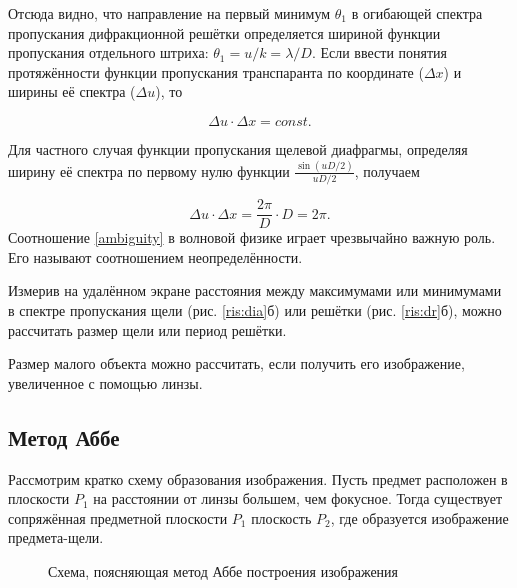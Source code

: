 \documentclass[a5paper,10pt, twoside]{article} %
\begin{document}
		Отсюда видно, что направление на первый минимум $\theta_1$ в огибающей спектра пропускания дифракционной решётки определяется шириной функции пропускания отдельного штриха: $\theta_1 = u / k = \lambda / D$. Если ввести понятия протяжённости функции пропускания транспаранта по координате ($\Delta x$) и ширины её спектра ($\Delta u$), то
		
		\begin{equation}\label{ambiguity}
			\Delta u \cdot \Delta x = const.
		\end{equation}
		
		Для частного случая функции пропускания щелевой диафрагмы, определяя ширину её спектра по первому нулю функции $\frac{\sin (uD / 2)}{uD / 2}$, получаем
		
		\begin{displaymath}
		\Delta u \cdot \Delta x = \frac{2 \pi}{D} \cdot D = 2 \pi.
		\end{displaymath}
		Соотношение \eqref{ambiguity} в волновой физике играет чрезвычайно важную роль. Его называют соотношением неопределённости.
		
		Измерив на удалённом экране расстояния между максимумами или минимумами в спектре пропускания щели (рис. \ref{ris:dia}б) или решётки (рис. \ref{ris:dr}б), можно рассчитать размер щели или период решётки.
		
		Размер малого объекта можно рассчитать, если получить его изображение, увеличенное с помощью линзы.
		
	\subsection{Метод Аббе}
		
		Рассмотрим кратко схему образования изображения. Пусть предмет расположен в плоскости $P_1$ на расстоянии от линзы большем, чем фокусное. Тогда существует сопряжённая предметной плоскости $P_1$ плоскость $P_2$, где образуется изображение предмета-щели.
		
		\begin{figure}[h]
			\caption{Схема, поясняющая метод Аббе построения изображения}
			\label{ris:abbe}
		\end{figure}
		
\end{document}
